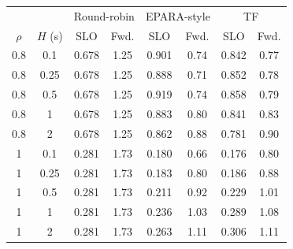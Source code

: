 \begin{tabular}{cc|cc|cc|cc}
\toprule
 & & \multicolumn{2}{c|}{Round-robin} & \multicolumn{2}{c|}{EPARA-style} & \multicolumn{2}{c}{TF}\\
$\rho$ & $H$ (s) & SLO & Fwd. & SLO & Fwd. & SLO & Fwd.\\
\midrule
0.8 & 0.1 & 0.678 & 1.25 & 0.901 & 0.74 & 0.842 & 0.77 \\
0.8 & 0.25 & 0.678 & 1.25 & 0.888 & 0.71 & 0.852 & 0.78 \\
0.8 & 0.5 & 0.678 & 1.25 & 0.919 & 0.74 & 0.858 & 0.79 \\
0.8 & 1 & 0.678 & 1.25 & 0.883 & 0.80 & 0.841 & 0.83 \\
0.8 & 2 & 0.678 & 1.25 & 0.862 & 0.88 & 0.781 & 0.90 \\
\midrule
1 & 0.1 & 0.281 & 1.73 & 0.180 & 0.66 & 0.176 & 0.80 \\
1 & 0.25 & 0.281 & 1.73 & 0.183 & 0.80 & 0.186 & 0.88 \\
1 & 0.5 & 0.281 & 1.73 & 0.211 & 0.92 & 0.229 & 1.01 \\
1 & 1 & 0.281 & 1.73 & 0.236 & 1.03 & 0.289 & 1.08 \\
1 & 2 & 0.281 & 1.73 & 0.263 & 1.11 & 0.306 & 1.11 \\
\bottomrule
\end{tabular}
